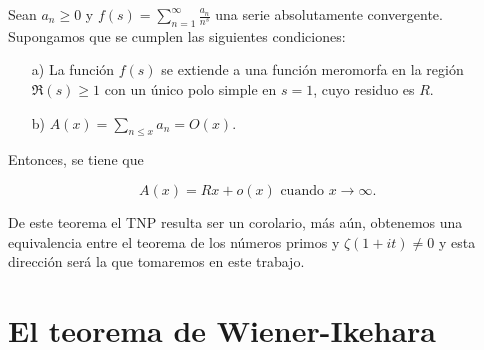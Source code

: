 \begin{theorem}
Sean $a_n \geq 0$ y $f(s)=\displaystyle\sum_{n=1}^{\infty} \frac{a_n}{n^s}$ una serie absolutamente convergente. Supongamos que se cumplen las siguientes condiciones:

\begin{itemize}
\item[a)] La función $f(s)$ se extiende a una función meromorfa en la región $\Re(s) \geq 1$ con un único polo simple en $s=1$, cuyo residuo es $R$.
\item[b)] $A(x)=\displaystyle \sum_{n \leq x} a_n=O(x)$.
\end{itemize}


Entonces, se tiene que

$$
A(x)=R x+o(x) \text { cuando } x \rightarrow \infty \text {. }
$$
\end{theorem}

De este teorema el TNP resulta ser un corolario, más aún, obtenemos una equivalencia entre el teorema de los números primos y $\zeta(1+it)\neq 0$ y esta dirección será la que tomaremos en este trabajo.
\section{El teorema de Wiener-Ikehara}

